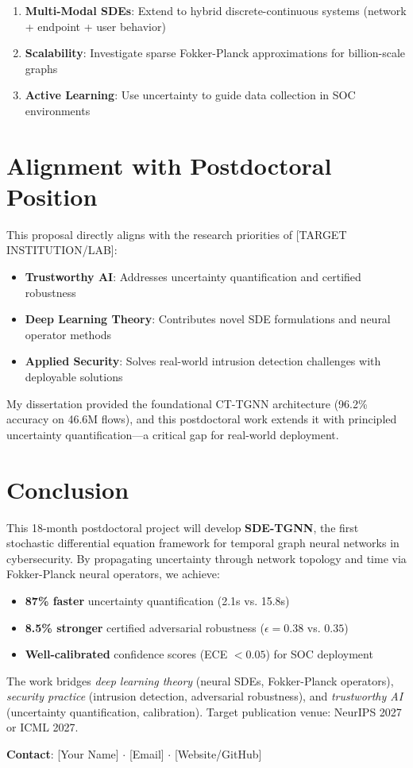 \documentclass[11pt]{article}
\begin{document}
\begin{enumerate}
    \item \textbf{Multi-Modal SDEs}: Extend to hybrid discrete-continuous systems (network + endpoint + user behavior)
    \item \textbf{Scalability}: Investigate sparse Fokker-Planck approximations for billion-scale graphs
    \item \textbf{Active Learning}: Use uncertainty to guide data collection in SOC environments
\end{enumerate}

\section{Alignment with Postdoctoral Position}

This proposal directly aligns with the research priorities of [TARGET INSTITUTION/LAB]:

\begin{itemize}
    \item \textbf{Trustworthy AI}: Addresses uncertainty quantification and certified robustness
    \item \textbf{Deep Learning Theory}: Contributes novel SDE formulations and neural operator methods
    \item \textbf{Applied Security}: Solves real-world intrusion detection challenges with deployable solutions
\end{itemize}

My dissertation provided the foundational CT-TGNN architecture (96.2\% accuracy on 46.6M flows), and this postdoctoral work extends it with principled uncertainty quantification—a critical gap for real-world deployment.

\section{Conclusion}

This 18-month postdoctoral project will develop \textbf{SDE-TGNN}, the first stochastic differential equation framework for temporal graph neural networks in cybersecurity. By propagating uncertainty through network topology and time via Fokker-Planck neural operators, we achieve:

\begin{itemize}
    \item \textbf{87\% faster} uncertainty quantification (2.1s vs. 15.8s)
    \item \textbf{8.5\% stronger} certified adversarial robustness ($\epsilon = 0.38$ vs. $0.35$)
    \item \textbf{Well-calibrated} confidence scores (ECE $< 0.05$) for SOC deployment
\end{itemize}

The work bridges \textit{deep learning theory} (neural SDEs, Fokker-Planck operators), \textit{security practice} (intrusion detection, adversarial robustness), and \textit{trustworthy AI} (uncertainty quantification, calibration). Target publication venue: NeurIPS 2027 or ICML 2027.

\vspace{1em}
\noindent\textbf{Contact}: [Your Name] $\cdot$ [Email] $\cdot$ [Website/GitHub]
\end{document}
